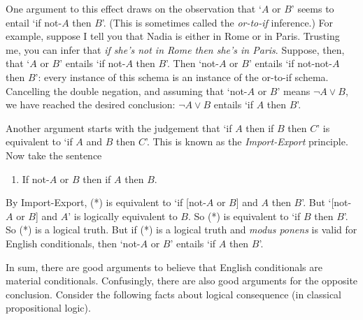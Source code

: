
One argument to this effect draws on the observation that `$A$ or $B$' seems to
entail `if not-$A$ then $B$'. (This is sometimes called the \emph{or-to-if}
inference.) For example, suppose I tell you that Nadia is either in Rome or in
Paris. Trusting me, you can infer that \emph{if she's not in Rome then she's in
  Paris}. Suppose, then, that `$A$ or $B$' entails `if not-$A$ then $B$'. Then
`not-$A$ or $B$' entails `if not-not-$A$ then $B$': every instance of this
schema is an instance of the or-to-if schema. Cancelling the double negation,
and assuming that `not-$A$ or $B$' means $\neg A \lor B$, we have reached the
desired conclusion: $\neg A \lor B$ entails `if $A$ then $B$'.

Another argument starts with the judgement that `if $A$ then if $B$ then $C$' is
equivalent to `if $A$ and $B$ then $C$'. This is known as the
\emph{Import-Export} principle. Now take the sentence
\begin{enumerate}[leftmargin=10mm]
  \item[(*)] If not-$A$ or $B$ then if $A$ then $B$.
\end{enumerate}
By Import-Export, (*) is equivalent to `if [not-$A$ or $B$] and $A$ then $B$'.
But `[not-$A$ or $B$] and $A$' is logically equivalent to $B$.
So (*) is equivalent to `if $B$ then $B$'.
So (*) is a logical truth.
But if (*) is a logical truth and \emph{modus ponens} is valid for English conditionals,
then `not-$A$ or $B$' entails `if $A$ then $B$'.

In sum, there are good arguments to believe that English conditionals are
material conditionals. Confusingly, there are also good arguments for the
opposite conclusion. Consider the following facts about logical consequence (in
classical propositional logic).%
\label{paradoxes-mat-imp}
\begin{principles}
\\
\\
\\
\\
\end{principles}

